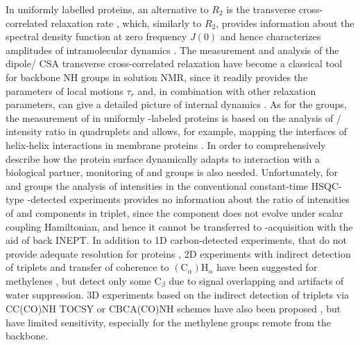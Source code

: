\documentclass[twocolumn]{svjour3}           %
\begin{document}
In uniformly labelled proteins, an alternative to $R_2$ is the transverse 
cross-correlated relaxation rate \gtwoXH, which, similarly to $R_2$, 
provides information about the spectral density function at zero frequency 
$J(0)$ and hence characterizes amplitudes of intramolecular dynamics 
\cite{yang_probing_2011}. The measurement and analysis of the 
di\-pole\slash{} CSA transverse cross-correlated relaxation \gtwoNNH{} 
have become a classical tool for backbone NH groups in solution {NMR}, 
since it readily provides the parameters of local motions $\tau_r$ 
\cite{chill_measurement_2006} and, in combination with other relaxation 
parameters, can give a detailed picture of internal dynamics 
\cite{cavanagh_protein_2007,charlier_protein_2016}. As for the \CHthree{} 
groups, the measurement of \gtwoCH{} in uniformly \nclab-labeled proteins 
is based on the analysis of \qinner\slash \qouter{} intensity ratio in 
\clab{} quadruplets \cite{zhang_probing_2006} and allows, for example, 
mapping the interfaces of helix-helix interactions in membrane proteins 
\cite{lesovoy_nmr_2017}. In order to comprehensively describe how the 
protein surface dynamically adapts to interaction with a biological 
partner, monitoring of \CHtwo{} and \NHtwo{} groups is also needed. 
Unfortunately, for \CHtwo{} and \NHtwo{} groups the analysis of 
intensities in the conventional constant-time {HSQC}-type \hlab-detected 
experiments \cite{zhang_probing_2006,lesovoy_nmr_2017} provides no 
information about the ratio of intensities of \qinner{} and \qouter{}
components in \CHtwo{} triplet, since the \qinner{} component 
\TermInner{}
does not evolve under \oneJch{} scalar coupling Hamiltonian, 
and hence it cannot be transferred to \hlab-acquisition with the aid 
of back {INEPT}. In addition to 1D carbon-detected experiments, that 
do not provide adequate resolution for proteins 
\cite{ghalebani_nmr_2008,kaderavek_spectral_2016}, 2D experiments with
indirect detection of \clab{} triplets and transfer of coherence to
$(\text{C}_\alpha) \text{H}_\alpha$ have been suggested for methylenes 
\cite{banci_side_2001}, but detect only some $\text{C}_\beta$ due to 
signal overlapping and artifacts of water suppression. 3D experiments 
based on the indirect detection of \clab{} triplets via CC(CO)NH {TOCSY} or CBCA(CO)NH schemes have also been proposed \cite{zheng_measurement_2004,yang_1h13c_1999},
but have limited sensitivity, especially for the methylene groups 
remote from the backbone. 
\end{document}
